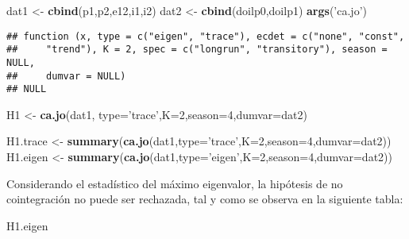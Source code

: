 \documentclass[]{book}
\newenvironment{Shaded}{\begin{snugshade}}{\end{snugshade}}
\newcommand{\KeywordTok}[1]{\textcolor[rgb]{0.13,0.29,0.53}{\textbf{#1}}}
\newcommand{\DataTypeTok}[1]{\textcolor[rgb]{0.13,0.29,0.53}{#1}}
\newcommand{\DecValTok}[1]{\textcolor[rgb]{0.00,0.00,0.81}{#1}}
\newcommand{\StringTok}[1]{\textcolor[rgb]{0.31,0.60,0.02}{#1}}
\newcommand{\NormalTok}[1]{#1}
\theoremstyle{definition}
\theoremstyle{definition}
\theoremstyle{definition}
\theoremstyle{remark}
\begin{document}
\begin{Shaded}
\begin{Highlighting}[]
\NormalTok{dat1 <-}\StringTok{ }\KeywordTok{cbind}\NormalTok{(p1,p2,e12,i1,i2)}
\NormalTok{dat2 <-}\StringTok{ }\KeywordTok{cbind}\NormalTok{(doilp0,doilp1)}
\KeywordTok{args}\NormalTok{(}\StringTok{'ca.jo'}\NormalTok{)}
\end{Highlighting}
\end{Shaded}

\begin{verbatim}
## function (x, type = c("eigen", "trace"), ecdet = c("none", "const", 
##     "trend"), K = 2, spec = c("longrun", "transitory"), season = NULL, 
##     dumvar = NULL) 
## NULL
\end{verbatim}

\begin{Shaded}
\begin{Highlighting}[]
\NormalTok{H1 <-}\StringTok{ }\KeywordTok{ca.jo}\NormalTok{(dat1, }\DataTypeTok{type=}\StringTok{'trace'}\NormalTok{,}\DataTypeTok{K=}\DecValTok{2}\NormalTok{,}\DataTypeTok{season=}\DecValTok{4}\NormalTok{,}\DataTypeTok{dumvar=}\NormalTok{dat2)}

\NormalTok{H1.trace <-}\StringTok{ }\KeywordTok{summary}\NormalTok{(}\KeywordTok{ca.jo}\NormalTok{(dat1,}\DataTypeTok{type=}\StringTok{'trace'}\NormalTok{,}\DataTypeTok{K=}\DecValTok{2}\NormalTok{,}\DataTypeTok{season=}\DecValTok{4}\NormalTok{,}\DataTypeTok{dumvar=}\NormalTok{dat2))}
\NormalTok{H1.eigen <-}\StringTok{ }\KeywordTok{summary}\NormalTok{(}\KeywordTok{ca.jo}\NormalTok{(dat1,}\DataTypeTok{type=}\StringTok{'eigen'}\NormalTok{,}\DataTypeTok{K=}\DecValTok{2}\NormalTok{,}\DataTypeTok{season=}\DecValTok{4}\NormalTok{,}\DataTypeTok{dumvar=}\NormalTok{dat2))}
\end{Highlighting}
\end{Shaded}

Considerando el estadístico del máximo eigenvalor, la hipótesis de no
cointegración no puede ser rechazada, tal y como se observa en la
siguiente tabla:

\begin{Shaded}
\begin{Highlighting}[]
\NormalTok{H1.eigen}
\end{Highlighting}
\end{Shaded}
\end{document}
